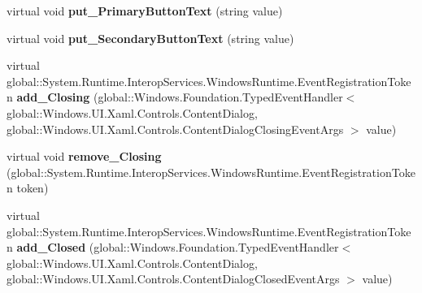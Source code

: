 \begin{DoxyCompactItemize}
\item 
\mbox{\label{class_windows_1_1_u_i_1_1_xaml_1_1_controls_1_1_content_dialog_adcf99702d4b190842bce4c72ae4f8e60}} 
virtual void {\bfseries put\+\_\+\+Primary\+Button\+Text} (string value)
\item 
\mbox{\label{class_windows_1_1_u_i_1_1_xaml_1_1_controls_1_1_content_dialog_a0c1be8e4e5f2ada768536bad2d8ca78b}} 
virtual void {\bfseries put\+\_\+\+Secondary\+Button\+Text} (string value)
\item 
\mbox{\label{class_windows_1_1_u_i_1_1_xaml_1_1_controls_1_1_content_dialog_a112044e25750429e881c4e8edede4a3b}} 
virtual global\+::\+System.\+Runtime.\+Interop\+Services.\+Windows\+Runtime.\+Event\+Registration\+Token {\bfseries add\+\_\+\+Closing} (global\+::\+Windows.\+Foundation.\+Typed\+Event\+Handler$<$ global\+::\+Windows.\+U\+I.\+Xaml.\+Controls.\+Content\+Dialog, global\+::\+Windows.\+U\+I.\+Xaml.\+Controls.\+Content\+Dialog\+Closing\+Event\+Args $>$ value)
\item 
\mbox{\label{class_windows_1_1_u_i_1_1_xaml_1_1_controls_1_1_content_dialog_a13479534a17ee5bc6c49534a00724ca9}} 
virtual void {\bfseries remove\+\_\+\+Closing} (global\+::\+System.\+Runtime.\+Interop\+Services.\+Windows\+Runtime.\+Event\+Registration\+Token token)
\item 
\mbox{\label{class_windows_1_1_u_i_1_1_xaml_1_1_controls_1_1_content_dialog_a6211ece9675f87d6eff022d36ec839af}} 
virtual global\+::\+System.\+Runtime.\+Interop\+Services.\+Windows\+Runtime.\+Event\+Registration\+Token {\bfseries add\+\_\+\+Closed} (global\+::\+Windows.\+Foundation.\+Typed\+Event\+Handler$<$ global\+::\+Windows.\+U\+I.\+Xaml.\+Controls.\+Content\+Dialog, global\+::\+Windows.\+U\+I.\+Xaml.\+Controls.\+Content\+Dialog\+Closed\+Event\+Args $>$ value)
\item 
\mbox{\label{class_windows_1_1_u_i_1_1_xaml_1_1_controls_1_1_content_dialog_aa69d94be955777eb910008418fd76375}} 

\end{DoxyCompactItemize}
